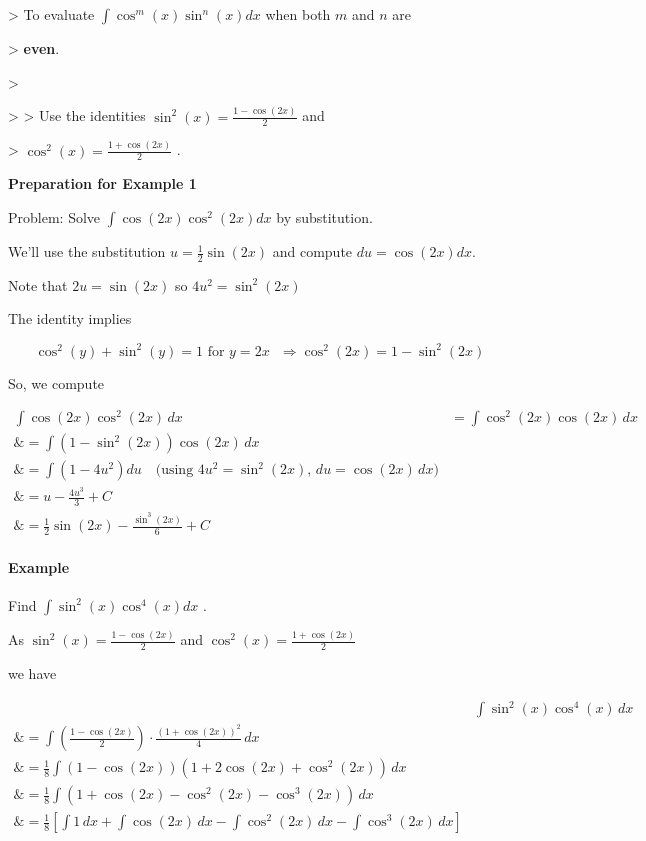 > To evaluate $\int\cos^m(x)\sin^n(x)dx$ when both $m$ and $n$ are

> \textbf{even}.

>

> > Use the identities $\sin^2(x)=\frac{1-\cos(2x)}{2}$ and

> $\cos^2(x)=\frac{1+\cos(2x)}{2}$ .



\textbf{Preparation for Example 1}



Problem: Solve $\int \cos(2x) \cos^2(2x)dx$ by substitution.



We'll use the substitution $u = \frac{1}{2} \sin(2x)$ and compute $du=\cos(2x)dx$.



Note that $2u = \sin(2x)$ so $4u^2 = \sin^2(2x)$



The identity implies

$$\cos^2(y) + \sin^2(y) = 1 \text{ for } y = 2x \text{ } \Rightarrow \cos^2(2x) = 1 - \sin^2(2x)$$

So, we compute



\begin{align}
\int \cos(2x) \cos^2(2x)\,dx &= \int \cos^2(2x) \cos(2x)\,dx \\\&= \int \left( 1 - \sin^2(2x) \right) \cos(2x)\,dx \\\&= \int \left( 1 - 4u^2 \right) du \quad \text{(using } 4u^2 = \sin^2(2x),\, du = \cos(2x)\,dx\text{)} \\\&= u - \frac{4u^3}{3} + C \\\&= \frac{1}{2} \sin(2x) - \frac{\sin^3(2x)}{6} + C
\end{align}





\paragraph{Example}



Find $\int\sin^2(x)\cos^4(x)dx$ .



As $\sin^2(x)=\frac{1-\cos(2x)}{2}$ and $\cos^2(x)=\frac{1+\cos(2x)}{2}$

we have



\begin{align}
& \int \sin^2(x) \cos^4(x) \, dx \\\& = \int \left(\frac{1 - \cos(2x)}{2}\right) \cdot \frac{(1 + \cos(2x))^2}{4} \, dx \\\& = \frac{1}{8} \int (1 - \cos(2x))(1 + 2\cos(2x) + \cos^2(2x)) \, dx \\\& = \frac{1}{8} \int \left(1 + \cos(2x) - \cos^2(2x) - \cos^3(2x)\right) \, dx \\\& = \frac{1}{8} \left[\int 1 \, dx + \int \cos(2x) \, dx - \int \cos^2(2x) \, dx - \int \cos^3(2x) \, dx\right]
\end{align}



